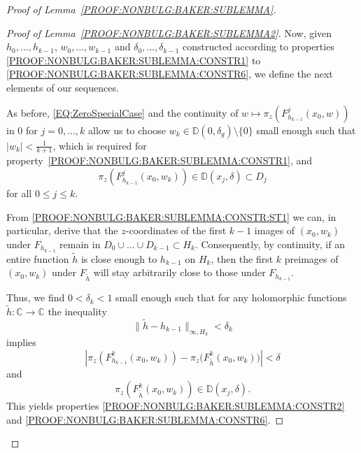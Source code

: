 \documentclass[a4paper, 12pt, twoside]{amsart}
\theoremstyle{definition}
\numberwithin{equation}{section}
\newcommand{\C}{{\mathbb C}}
\newcommand{\D}{{\mathbb D}}
\begin{document}
\begin{proof}[Proof of Lemma~\ref{PROOF:NONBULG:BAKER:SUBLEMMA}]
\begin{proof}[Proof of Lemma~\ref{PROOF:NONBULG:BAKER:SUBLEMMA2}]
            Now, given $h_0, \dots, h_{k-1}$, $w_0, \dots, w_{k-1}$ and $\delta_0, \dots, \delta_{k-1}$ constructed according to properties \eqref{PROOF:NONBULG:BAKER:SUBLEMMA:CONSTR1} to \eqref{PROOF:NONBULG:BAKER:SUBLEMMA:CONSTR6}, we define the next elements of our sequences. 

            As before, \eqref{EQ:ZeroSpecialCase} and the continuity of $w \mapsto \pi_z( F^j_{h_{k-1}}(x_0,w) )$ in $0$ for $j = 0, \dots, k$ allow us to choose $w_{k} \in \D(0,\delta_g) \setminus \{0\}$ small enough such that $|{w_{k}}| < \frac{1}{k+1}$, which is required for property~\eqref{PROOF:NONBULG:BAKER:SUBLEMMA:CONSTR1}, and 
            \begin{equation}\label{PROOF:NONBULG:BAKER:SUBLEMMA:CONSTR:ST1}
                \pi_z( F^{j}_{h_{k-1}}(x_0, w_{k}) )\in \D(x_{j}, \delta) \subset D_j
            \end{equation}
            for all $0 \leq j \leq k$.

            From \eqref{PROOF:NONBULG:BAKER:SUBLEMMA:CONSTR:ST1} we can, in particular, derive that the $z$-coordinates of the first $k-1$ images of $(x_0, w_{k})$ under $F_{h_{k-1}}$ remain in $ D_0 \cup \dots \cup D_{k-1} \subset H_{k}$. Consequently, by continuity, if an entire function $\widetilde{h}$ is close enough to $h_{k-1}$ on $H_k$, then the first $k$ preimages of $(x_0, w_{k})$ under $F_{\widetilde{h}}$ will stay arbitrarily close to those under $F_{h_{k-1}}$.

            Thus, we find $ 0 < \delta_{k} < 1 $ small enough such that for any holomorphic functions $\widetilde{h} : \C \to \C$ the inequality
            \begin{equation}\label{PROOF:NONBULG:BAKER:SUBLEMMA2:EQ12}
                \|{\widetilde{h} - h_{k-1}}\|_{\infty, H_{k}} < \delta_{k}
            \end{equation}
            implies
            \begin{equation}\label{PROOF:NONBULG:BAKER:SUBLEMMA2:EQ13}
                |{\pi_z( F^{k}_{h_{k-1}}(x_0, w_{k})) - \pi_z (F^{k}_{\widetilde{h}}(x_0, w_{k})})| < \delta
            \end{equation}
            and
            \begin{equation}\label{PROOF:NONBULG:BAKER:SUBLEMMA2:EQ14}
                \pi_z( F^{k}_{\widetilde{h}}(x_0, w_{k})) \in \D(x_{j}, \delta).
            \end{equation}
            This yields properties \eqref{PROOF:NONBULG:BAKER:SUBLEMMA:CONSTR2} and \eqref{PROOF:NONBULG:BAKER:SUBLEMMA:CONSTR6}.


\end{proof}
\end{proof}
\end{document}
